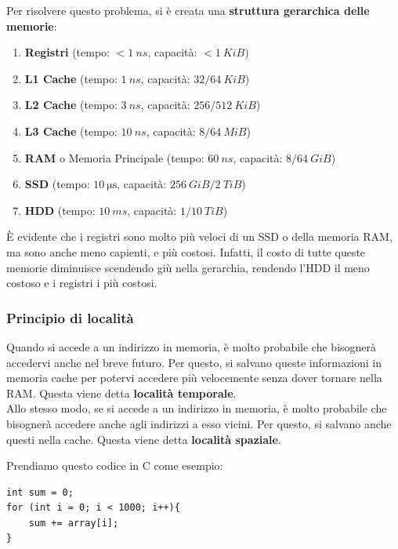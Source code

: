 \documentclass[11pt, a4paper, titlepage, oneside]{scrbook}
\begin{document}
Per risolvere questo problema, si è creata una \textbf{struttura gerarchica delle memorie}:
\begin{enumerate}[label=\arabic*°]
    \item \textbf{Registri} (tempo: $<\SI{1}{ns}$, capacità: $<\SI{1}{KiB}$)
    \item \textbf{L1 Cache} (tempo: $\SI{1}{ns}$, capacità: $32/\SI{64}{KiB}$)
    \item \textbf{L2 Cache} (tempo: $\SI{3}{ns}$, capacità: $256/\SI{512}{KiB}$)
    \item \textbf{L3 Cache} (tempo: $\SI{10}{ns}$, capacità: $8/\SI{64}{MiB}$)
    \item \textbf{RAM} o Memoria Principale (tempo: $\SI{60}{ns}$, capacità: $8/\SI{64}{GiB}$)
    \item \textbf{SSD} (tempo: $\SI{10}{\micro\second}$, capacità: $\SI{256}{GiB}/\SI{2}{TiB}$)
    \item \textbf{HDD} (tempo: $\SI{10}{ms}$, capacità: $1/\SI{10}{TiB}$)
\end{enumerate}

È evidente che i registri sono molto più veloci di un SSD o della memoria RAM, ma sono anche meno capienti, e più costosi. Infatti, il costo di tutte queste memorie diminuisce scendendo giù nella gerarchia, rendendo l'HDD il meno costoso e i registri i più costosi.

\subsubsection*{Principio di località}

\begin{Proprieta}
\label{prop-principio-località}
Quando si accede a un indirizzo in memoria, è molto probabile che bisognerà accedervi anche nel breve futuro. Per questo, si salvano queste informazioni in memoria cache per potervi accedere più velocemente senza dover tornare nella RAM. Questa viene detta \textbf{località temporale}. \\
Allo stesso modo, se si accede a un indirizzo in memoria, è molto probabile che bisognerà accedere anche agli indirizzi a esso vicini. Per questo, si salvano anche questi nella cache. Questa viene detta \textbf{località spaziale}.
\end{Proprieta}

Prendiamo questo codice in C come esempio:
\begin{lstlisting}[style=C]
int sum = 0;
for (int i = 0; i < 1000; i++){
    sum += array[i];
}
\end{lstlisting}
\end{document}
